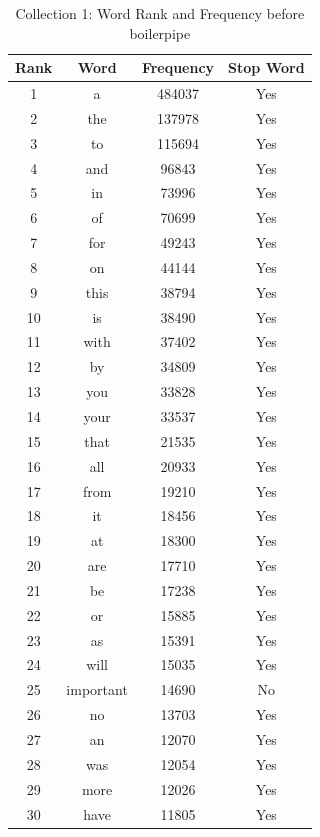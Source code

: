 \begin{table}

\caption{Collection 1: Word Rank and Frequency before boilerpipe}
\begin{center}
\begin{tabular}{ c | c | c | c}
\hline
Rank & Word & Frequency & Stop Word \\ \hline

1 & a & 484037 & Yes \\ \hline
2 & the & 137978 & Yes \\ \hline
3 & to & 115694 & Yes \\ \hline
4 & and & 96843 & Yes \\ \hline
5 & in & 73996 & Yes \\ \hline
6 & of & 70699 & Yes \\ \hline
7 & for & 49243 & Yes \\ \hline
8 & on & 44144 & Yes \\ \hline
9 & this & 38794 & Yes \\ \hline
10 & is & 38490 & Yes \\ \hline
11 & with & 37402 & Yes \\ \hline
12 & by & 34809 & Yes \\ \hline
13 & you & 33828 & Yes \\ \hline
14 & your & 33537 & Yes \\ \hline
15 & that & 21535 & Yes \\ \hline
16 & all & 20933 & Yes \\ \hline
17 & from & 19210 & Yes \\ \hline
18 & it & 18456 & Yes \\ \hline
19 & at & 18300 & Yes \\ \hline
20 & are & 17710 & Yes \\ \hline
21 & be & 17238 & Yes \\ \hline
22 & or & 15885 & Yes \\ \hline
23 & as & 15391 & Yes \\ \hline
24 & will & 15035 & Yes \\ \hline
25 & important & 14690 & No \\ \hline
26 & no & 13703 & Yes \\ \hline
27 & an & 12070 & Yes \\ \hline
28 & was & 12054 & Yes \\ \hline
29 & more & 12026 & Yes \\ \hline
30 & have & 11805 & Yes \\ \hline

\end{tabular}
\end{center}
\end{table}
